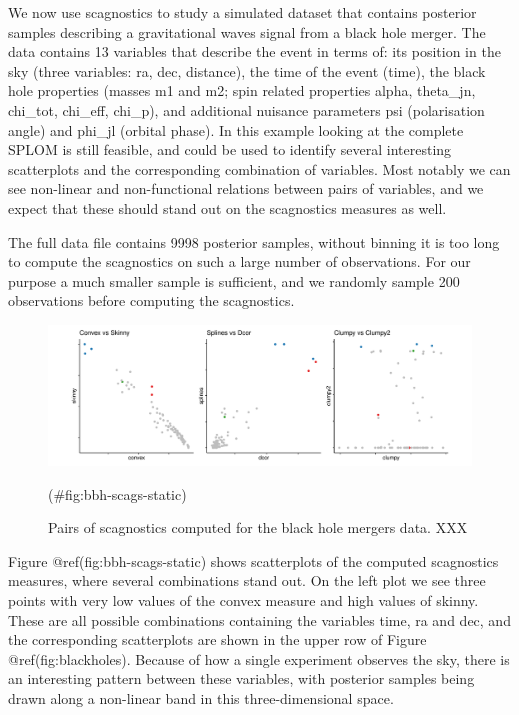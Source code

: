 We now use scagnostics to study a simulated dataset that contains
posterior samples describing a gravitational waves signal from a black
hole merger. The data contains 13 variables that describe the event in
terms of: its position in the sky (three variables: ra, dec, distance),
the time of the event (time), the black hole properties (masses m1 and
m2; spin related properties alpha, theta\_jn, chi\_tot, chi\_eff,
chi\_p), and additional nuisance parameters psi (polarisation angle) and
phi\_jl (orbital phase). In this example looking at the complete SPLOM
is still feasible, and could be used to identify several interesting
scatterplots and the corresponding combination of variables. Most
notably we can see non-linear and non-functional relations between pairs
of variables, and we expect that these should stand out on the
scagnostics measures as well.

The full data file contains 9998 posterior samples, without binning it
is too long to compute the scagnostics on such a large number of
observations. For our purpose a much smaller sample is sufficient, and
we randomly sample 200 observations before computing the scagnostics.

\begin{Schunk}
\begin{figure}
\includegraphics[width=1\linewidth]{mason-lee-laa-cook_files/figure-latex/bbh-scags-static-1} \caption[Pairs of scagnostics computed for the black hole mergers data]{Pairs of scagnostics computed for the black hole mergers data. XXX}(\#fig:bbh-scags-static)
\end{figure}
\end{Schunk}

Figure @ref(fig:bbh-scags-static) shows scatterplots of the computed
scagnostics measures, where several combinations stand out. On the left
plot we see three points with very low values of the convex measure and
high values of skinny. These are all possible combinations containing
the variables time, ra and dec, and the corresponding scatterplots are
shown in the upper row of Figure @ref(fig:blackholes). Because of how a
single experiment observes the sky, there is an interesting pattern
between these variables, with posterior samples being drawn along a
non-linear band in this three-dimensional space.

